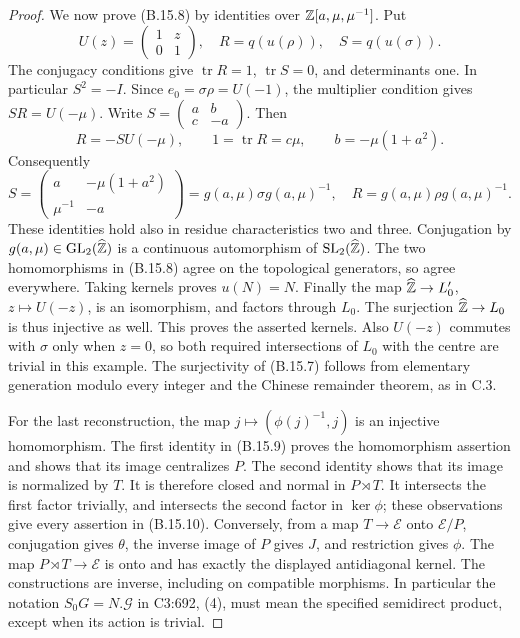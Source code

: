 \begin{proof}
We now prove (B.15.8) by identities over
\(\mathbb Z[a,\mu,\mu^{-1}]\). Put
\[
 U(z)=\begin{pmatrix}1&z\\0&1\end{pmatrix},\quad
 R=q(u(\rho)),\quad S=q(u(\sigma)).
\]
The conjugacy conditions give \(\operatorname{tr}R=1\),
\(\operatorname{tr}S=0\), and determinants one. In particular
\(S^2=-I\). Since \(e_0=\sigma\rho=U(-1)\), the multiplier
condition gives \(SR=U(-\mu)\). Write
\(S=\left(\begin{smallmatrix}a&b\\c&-a\end{smallmatrix}\right)\).
Then
\[
 R=-S U(-\mu),\qquad
 1=\operatorname{tr}R=c\mu,
 \qquad b=-\mu(1+a^2).
 \tag{B.15.12}
\]
Consequently
\[
 S=\begin{pmatrix}a&-\mu(1+a^2)\\\mu^{-1}&-a\end{pmatrix}
    =g(a,\mu)\sigma g(a,\mu)^{-1},\quad
 R=g(a,\mu)\rho g(a,\mu)^{-1}.
 \tag{B.15.13}
\]
These identities hold also in residue characteristics two and
three. Conjugation by \(g(a,\mu)\in\operatorname{GL}_2(\widehat{\mathbb Z})\)
is a continuous automorphism of \(\operatorname{SL}_2(\widehat{\mathbb Z})\).
The two homomorphisms in (B.15.8) agree on the topological
generators, so agree everywhere. Taking kernels proves
\(u(N)=N\). Finally the map
\(\widehat{\mathbb Z}\to L'_0\), \(z\mapsto U(-z)\), is an
isomorphism, and factors through \(L_0\). The surjection
\(\widehat{\mathbb Z}\to L_0\) is thus injective as well. This proves
the asserted kernels. Also \(U(-z)\) commutes with \(\sigma\)
only when \(z=0\), so both required intersections of \(L_0\)
with the centre are trivial in this example.
The surjectivity of (B.15.7) follows from
elementary generation modulo every integer and the Chinese
remainder theorem, as in C.3.

For the last reconstruction, the map
\(j\mapsto(\phi(j)^{-1},j)\) is an injective homomorphism.
The first identity in (B.15.9) proves the homomorphism assertion
and shows that its image centralizes \(P\). The second identity
shows that its image is normalized by \(T\). It is therefore
closed and normal in \(P\rtimes T\). It intersects the first
factor trivially, and intersects the second factor in
\(\ker\phi\); these observations give every assertion in
(B.15.10). Conversely, from a map \(T\to\mathcal E\) onto
\(\mathcal E/P\), conjugation gives \(\theta\), the inverse
image of \(P\) gives \(J\), and restriction gives \(\phi\).
The map \(P\rtimes T\to\mathcal E\) is onto and has exactly
the displayed antidiagonal kernel. The constructions are inverse,
including on compatible morphisms. In particular the notation
\(S_0G=N.\mathcal G\) in C3:692, (4), must mean the specified
semidirect product, except when its action is trivial.


\end{proof}

